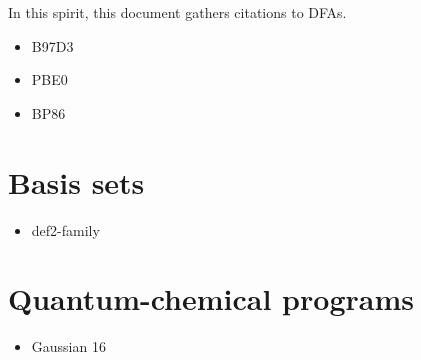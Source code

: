\documentclass[   %
  final,          %
  a4paper,        %
  8pt
]{extarticle}
\begin{document}
In this spirit, this document gathers citations to DFAs.

\begin{itemize}
  \item B97D3\autocite{Grimme2011}
  \item PBE0\autocite{pbe0}
  \item BP86\autocite{bp86}
\end{itemize}

\section{Basis sets}
\begin{itemize}
  \item def2-family\autocite{def2}
\end{itemize}

\section{Quantum-chemical programs}
\begin{itemize}
  \item Gaussian 16\autocite{g16}
\end{itemize}

\nocite{*}
\printbibliography
\end{document}
